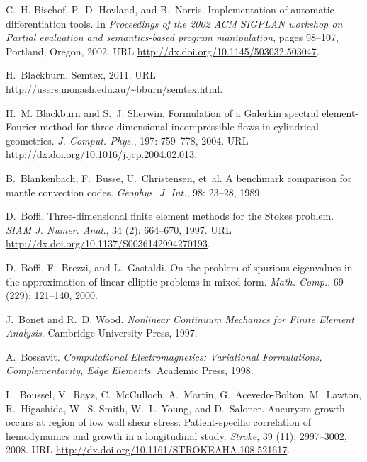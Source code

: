 \begin{thebibliography}{467}
C.~H. Bischof, P.~D. Hovland, and B.~Norris.
\newblock Implementation of automatic differentiation tools.
\newblock In \emph{Proceedings of the 2002 {ACM} {SIGPLAN} workshop on Partial
  evaluation and semantics-based program manipulation}, pages 98--107,
  Portland, Oregon, 2002.
\newblock URL \url{http://dx.doi.org/10.1145/503032.503047}.

H.~Blackburn.
\newblock Semtex, 2011.
\newblock URL \url{http://users.monash.edu.au/~bburn/semtex.html}.

H.~M. Blackburn and S.~J. Sherwin.
\newblock Formulation of a {G}alerkin spectral element-{F}ourier method for
  three-dimensional incompressible flows in cylindrical geometries.
\newblock \emph{J. Comput. Phys.}, 197: 759--778, 2004.
\newblock URL \url{http://dx.doi.org/10.1016/j.jcp.2004.02.013}.

B.~Blankenbach, F.~Busse, U.~Christensen, et~al.
\newblock A benchmark comparison for mantle convection codes.
\newblock \emph{Geophys. J. Int.}, 98: 23--28, 1989.

D.~Boffi.
\newblock Three-dimensional finite element methods for the {S}tokes problem.
\newblock \emph{SIAM J. Numer. Anal.}, 34 (2): 664--670,
  1997.
\newblock URL \url{http://dx.doi.org/10.1137/S0036142994270193}.

D.~Boffi, F.~Brezzi, and L.~Gastaldi.
\newblock On the problem of spurious eigenvalues in the approximation of linear
  elliptic problems in mixed form.
\newblock \emph{Math. Comp.}, 69 (229): 121--140, 2000.

J.~Bonet and R.~D. Wood.
\newblock \emph{Nonlinear Continuum Mechanics for Finite Element Analysis}.
\newblock Cambridge University Press, 1997.

A.~Bossavit.
\newblock \emph{Computational Electromagnetics: Variational Formulations,
  Complementarity, Edge Elements}.
\newblock Academic Press, 1998.

L.~Boussel, V.~Rayz, C.~McCulloch, A.~Martin, G.~Acevedo-Bolton, M.~Lawton,
  R.~Higashida, W.~S. Smith, W.~L. Young, and D.~Saloner.
\newblock Aneurysm growth occurs at region of low wall shear stress:
  Patient-specific correlation of hemodynamics and growth in a longitudinal
  study.
\newblock \emph{Stroke}, 39 (11): 2997--3002, 2008.
\newblock URL \url{http://dx.doi.org/10.1161/STROKEAHA.108.521617}.


\end{thebibliography}

